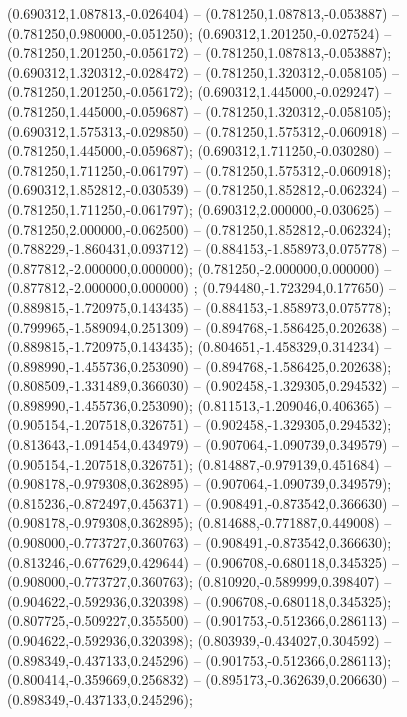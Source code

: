  (0.690312,1.087813,-0.026404) -- (0.781250,1.087813,-0.053887) -- (0.781250,0.980000,-0.051250);
 (0.690312,1.201250,-0.027524) -- (0.781250,1.201250,-0.056172) -- (0.781250,1.087813,-0.053887);
 (0.690312,1.320312,-0.028472) -- (0.781250,1.320312,-0.058105) -- (0.781250,1.201250,-0.056172);
 (0.690312,1.445000,-0.029247) -- (0.781250,1.445000,-0.059687) -- (0.781250,1.320312,-0.058105);
 (0.690312,1.575313,-0.029850) -- (0.781250,1.575312,-0.060918) -- (0.781250,1.445000,-0.059687);
 (0.690312,1.711250,-0.030280) -- (0.781250,1.711250,-0.061797) -- (0.781250,1.575312,-0.060918);
 (0.690312,1.852812,-0.030539) -- (0.781250,1.852812,-0.062324) -- (0.781250,1.711250,-0.061797);
 (0.690312,2.000000,-0.030625) -- (0.781250,2.000000,-0.062500) -- (0.781250,1.852812,-0.062324);
 (0.788229,-1.860431,0.093712) -- (0.884153,-1.858973,0.075778) -- (0.877812,-2.000000,0.000000);
 (0.781250,-2.000000,0.000000) -- (0.877812,-2.000000,0.000000) ;
 (0.794480,-1.723294,0.177650) -- (0.889815,-1.720975,0.143435) -- (0.884153,-1.858973,0.075778);
 (0.799965,-1.589094,0.251309) -- (0.894768,-1.586425,0.202638) -- (0.889815,-1.720975,0.143435);
 (0.804651,-1.458329,0.314234) -- (0.898990,-1.455736,0.253090) -- (0.894768,-1.586425,0.202638);
 (0.808509,-1.331489,0.366030) -- (0.902458,-1.329305,0.294532) -- (0.898990,-1.455736,0.253090);
 (0.811513,-1.209046,0.406365) -- (0.905154,-1.207518,0.326751) -- (0.902458,-1.329305,0.294532);
 (0.813643,-1.091454,0.434979) -- (0.907064,-1.090739,0.349579) -- (0.905154,-1.207518,0.326751);
 (0.814887,-0.979139,0.451684) -- (0.908178,-0.979308,0.362895) -- (0.907064,-1.090739,0.349579);
 (0.815236,-0.872497,0.456371) -- (0.908491,-0.873542,0.366630) -- (0.908178,-0.979308,0.362895);
 (0.814688,-0.771887,0.449008) -- (0.908000,-0.773727,0.360763) -- (0.908491,-0.873542,0.366630);
 (0.813246,-0.677629,0.429644) -- (0.906708,-0.680118,0.345325) -- (0.908000,-0.773727,0.360763);
 (0.810920,-0.589999,0.398407) -- (0.904622,-0.592936,0.320398) -- (0.906708,-0.680118,0.345325);
 (0.807725,-0.509227,0.355500) -- (0.901753,-0.512366,0.286113) -- (0.904622,-0.592936,0.320398);
 (0.803939,-0.434027,0.304592) -- (0.898349,-0.437133,0.245296) -- (0.901753,-0.512366,0.286113);
 (0.800414,-0.359669,0.256832) -- (0.895173,-0.362639,0.206630) -- (0.898349,-0.437133,0.245296);
